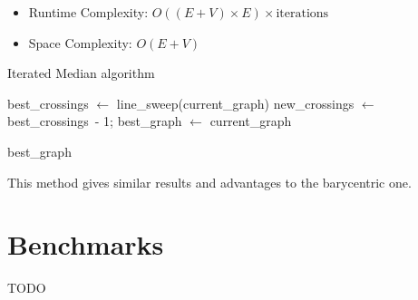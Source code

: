 \documentclass[a4paper]{article}
\begin{document}
\begin{itemize}
	\item Runtime Complexity: $O((E + V) \times E) \times \text{iterations}$
	\item Space Complexity: $O(E + V)$\\
\end{itemize}

\begin{algorithm}
	\caption{Iterated Median algorithm}
	\DontPrintSemicolon
	\BlankLine

	best\_crossings $\gets$ line\_sweep(current\_graph)\;
	new\_crossings $\gets$ best\_crossings\ - 1;
	best\_graph $\gets$ current\_graph\;
	\BlankLine


	\Return best\_graph\;
\end{algorithm}

This method gives similar results and advantages to the barycentric one.

\eject

\section{Benchmarks}

TODO

\eject



\end{document}
